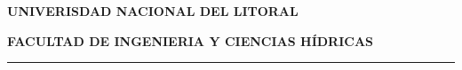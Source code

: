 	{\color{epsc:oscuro}
	\centering                                                              

        {\LARGE\textbf{UNIVERISDAD NACIONAL DEL LITORAL}}\par\vspace{0.5cm}      

		{\large\textbf{FACULTAD DE INGENIERIA Y CIENCIAS HÍDRICAS}}\par        

	}

\begin{flushright}                                  
	
	{\color{epsc:verde} \rule{7cm}{0.5mm}}
	
\end{flushright}


